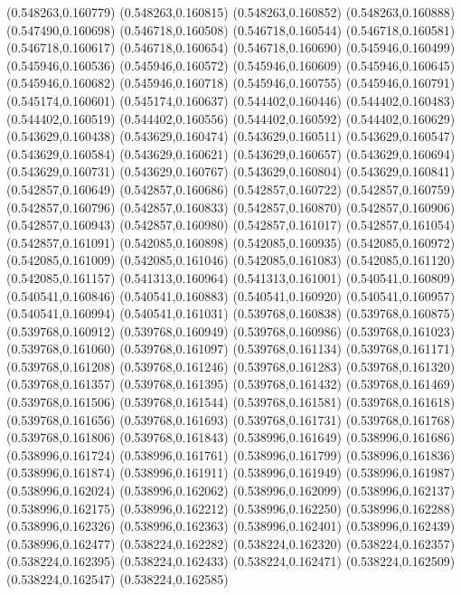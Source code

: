 (0.548263,0.160779)
(0.548263,0.160815)
(0.548263,0.160852)
(0.548263,0.160888)
(0.547490,0.160698)
(0.546718,0.160508)
(0.546718,0.160544)
(0.546718,0.160581)
(0.546718,0.160617)
(0.546718,0.160654)
(0.546718,0.160690)
(0.545946,0.160499)
(0.545946,0.160536)
(0.545946,0.160572)
(0.545946,0.160609)
(0.545946,0.160645)
(0.545946,0.160682)
(0.545946,0.160718)
(0.545946,0.160755)
(0.545946,0.160791)
(0.545174,0.160601)
(0.545174,0.160637)
(0.544402,0.160446)
(0.544402,0.160483)
(0.544402,0.160519)
(0.544402,0.160556)
(0.544402,0.160592)
(0.544402,0.160629)
(0.543629,0.160438)
(0.543629,0.160474)
(0.543629,0.160511)
(0.543629,0.160547)
(0.543629,0.160584)
(0.543629,0.160621)
(0.543629,0.160657)
(0.543629,0.160694)
(0.543629,0.160731)
(0.543629,0.160767)
(0.543629,0.160804)
(0.543629,0.160841)
(0.542857,0.160649)
(0.542857,0.160686)
(0.542857,0.160722)
(0.542857,0.160759)
(0.542857,0.160796)
(0.542857,0.160833)
(0.542857,0.160870)
(0.542857,0.160906)
(0.542857,0.160943)
(0.542857,0.160980)
(0.542857,0.161017)
(0.542857,0.161054)
(0.542857,0.161091)
(0.542085,0.160898)
(0.542085,0.160935)
(0.542085,0.160972)
(0.542085,0.161009)
(0.542085,0.161046)
(0.542085,0.161083)
(0.542085,0.161120)
(0.542085,0.161157)
(0.541313,0.160964)
(0.541313,0.161001)
(0.540541,0.160809)
(0.540541,0.160846)
(0.540541,0.160883)
(0.540541,0.160920)
(0.540541,0.160957)
(0.540541,0.160994)
(0.540541,0.161031)
(0.539768,0.160838)
(0.539768,0.160875)
(0.539768,0.160912)
(0.539768,0.160949)
(0.539768,0.160986)
(0.539768,0.161023)
(0.539768,0.161060)
(0.539768,0.161097)
(0.539768,0.161134)
(0.539768,0.161171)
(0.539768,0.161208)
(0.539768,0.161246)
(0.539768,0.161283)
(0.539768,0.161320)
(0.539768,0.161357)
(0.539768,0.161395)
(0.539768,0.161432)
(0.539768,0.161469)
(0.539768,0.161506)
(0.539768,0.161544)
(0.539768,0.161581)
(0.539768,0.161618)
(0.539768,0.161656)
(0.539768,0.161693)
(0.539768,0.161731)
(0.539768,0.161768)
(0.539768,0.161806)
(0.539768,0.161843)
(0.538996,0.161649)
(0.538996,0.161686)
(0.538996,0.161724)
(0.538996,0.161761)
(0.538996,0.161799)
(0.538996,0.161836)
(0.538996,0.161874)
(0.538996,0.161911)
(0.538996,0.161949)
(0.538996,0.161987)
(0.538996,0.162024)
(0.538996,0.162062)
(0.538996,0.162099)
(0.538996,0.162137)
(0.538996,0.162175)
(0.538996,0.162212)
(0.538996,0.162250)
(0.538996,0.162288)
(0.538996,0.162326)
(0.538996,0.162363)
(0.538996,0.162401)
(0.538996,0.162439)
(0.538996,0.162477)
(0.538224,0.162282)
(0.538224,0.162320)
(0.538224,0.162357)
(0.538224,0.162395)
(0.538224,0.162433)
(0.538224,0.162471)
(0.538224,0.162509)
(0.538224,0.162547)
(0.538224,0.162585)

